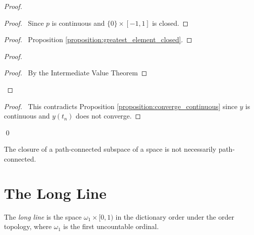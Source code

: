 \begin{proof}
    \pf
    \begin{proof}
        \pf\ Since $p$ is continuous and $\{0\} \times [-1,1]$ is closed.
    \end{proof}
    \begin{proof}
        \pf\ Proposition \ref{proposition:greatest_element_closed}.
    \end{proof}
    \step{5}{\pick\ a sequence $t_n$ in $(b,1]$ such that $t_n \rightarrow b$ and $y(t_n) = (-1)^n$ for all $n$}
    \begin{proof}
        \begin{proof}
            \pf\ By the Intermediate Value Theorem
        \end{proof}
    \end{proof}
    \qedstep
    \begin{proof}
        \pf\ This contradicts Proposition \ref{proposition:converge_continuous} since $y$ is continuous and $y(t_n)$ does not converge.
    \end{proof}
    \qed
\end{proof}

\begin{corollary}
    The closure of a path-connected subspace of a space is not necessarily path-connected.
\end{corollary}

\section{The Long Line}

\begin{definition}
    The \emph{long line} is the space $\omega_1 \times [0,1)$ in the dictionary order
    under the order topology, where $\omega_1$ is the first uncountable ordinal.
\end{definition}

